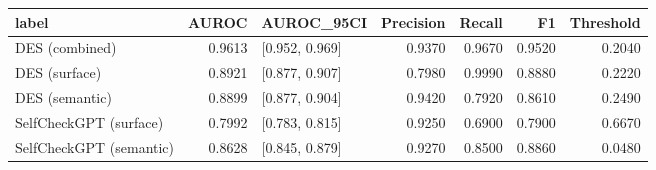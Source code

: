 \begin{tabular}{lrlrrrr}
\toprule
label & AUROC & AUROC_95CI & Precision & Recall & F1 & Threshold \\
\midrule
DES (combined) & 0.9613 & [0.952, 0.969] & 0.9370 & 0.9670 & 0.9520 & 0.2040 \\
DES (surface) & 0.8921 & [0.877, 0.907] & 0.7980 & 0.9990 & 0.8880 & 0.2220 \\
DES (semantic) & 0.8899 & [0.877, 0.904] & 0.9420 & 0.7920 & 0.8610 & 0.2490 \\
SelfCheckGPT (surface) & 0.7992 & [0.783, 0.815] & 0.9250 & 0.6900 & 0.7900 & 0.6670 \\
SelfCheckGPT (semantic) & 0.8628 & [0.845, 0.879] & 0.9270 & 0.8500 & 0.8860 & 0.0480 \\
\bottomrule
\end{tabular}
